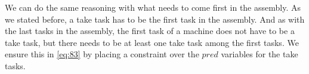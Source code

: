  We can do the same reasoning with what needs to come first in the assembly. As we stated before, a take task has to be the first task in the assembly. And as with the last tasks in the assembly, the first task of a machine does not have to be a take task, but there needs to be at least one take task among the first tasks. We ensure this in \ref{eq:83} by placing a constraint over the $pred$ variables for the take tasks.